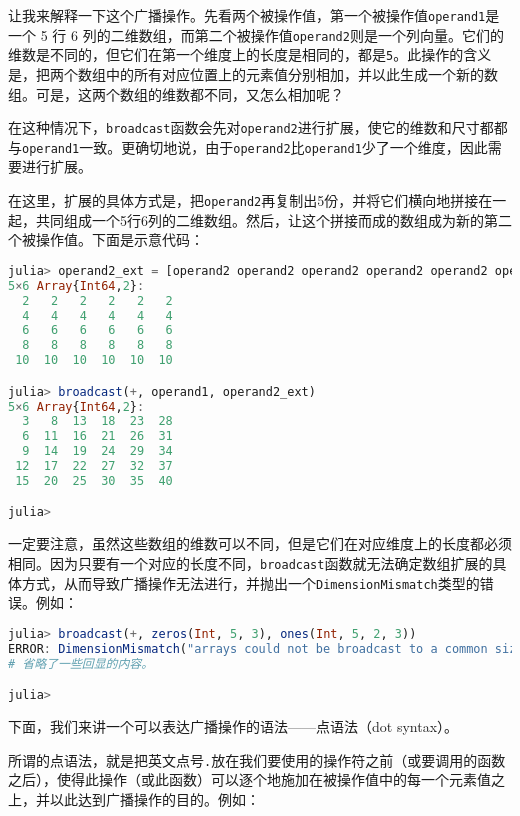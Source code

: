 让我来解释一下这个广播操作。先看两个被操作值，第一个被操作值\verb`operand1`是一个 5 行 6 列的二维数组，而第二个被操作值\verb`operand2`则是一个列向量。它们的维数是不同的，但它们在第一个维度上的长度是相同的，都是\verb`5`。此操作的含义是，把两个数组中的所有对应位置上的元素值分别相加，并以此生成一个新的数组。可是，这两个数组的维数都不同，又怎么相加呢？

在这种情况下，\verb`broadcast`函数会先对\verb`operand2`进行扩展，使它的维数和尺寸都都与\verb`operand1`一致。更确切地说，由于\verb`operand2`比\verb`operand1`少了一个维度，因此需要进行扩展。

在这里，扩展的具体方式是，把\verb`operand2`再复制出5份，并将它们横向地拼接在一起，共同组成一个5行6列的二维数组。然后，让这个拼接而成的数组成为新的第二个被操作值。下面是示意代码：

\begin{lstlisting}[language=julia]
julia> operand2_ext = [operand2 operand2 operand2 operand2 operand2 operand2]
5×6 Array{Int64,2}:
  2   2   2   2   2   2
  4   4   4   4   4   4
  6   6   6   6   6   6
  8   8   8   8   8   8
 10  10  10  10  10  10

julia> broadcast(+, operand1, operand2_ext)
5×6 Array{Int64,2}:
  3   8  13  18  23  28
  6  11  16  21  26  31
  9  14  19  24  29  34
 12  17  22  27  32  37
 15  20  25  30  35  40

julia> 
\end{lstlisting}

一定要注意，虽然这些数组的维数可以不同，但是它们在对应维度上的长度都必须相同。因为只要有一个对应的长度不同，\verb`broadcast`函数就无法确定数组扩展的具体方式，从而导致广播操作无法进行，并抛出一个\verb`DimensionMismatch`类型的错误。例如：

\begin{lstlisting}[language=julia]
julia> broadcast(+, zeros(Int, 5, 3), ones(Int, 5, 2, 3))
ERROR: DimensionMismatch("arrays could not be broadcast to a common size")
# 省略了一些回显的内容。

julia> 
\end{lstlisting}

下面，我们来讲一个可以表达广播操作的语法——点语法（dot syntax）。

所谓的点语法，就是把英文点号\verb`.`放在我们要使用的操作符之前（或要调用的函数之后），使得此操作（或此函数）可以逐个地施加在被操作值中的每一个元素值之上，并以此达到广播操作的目的。例如：

